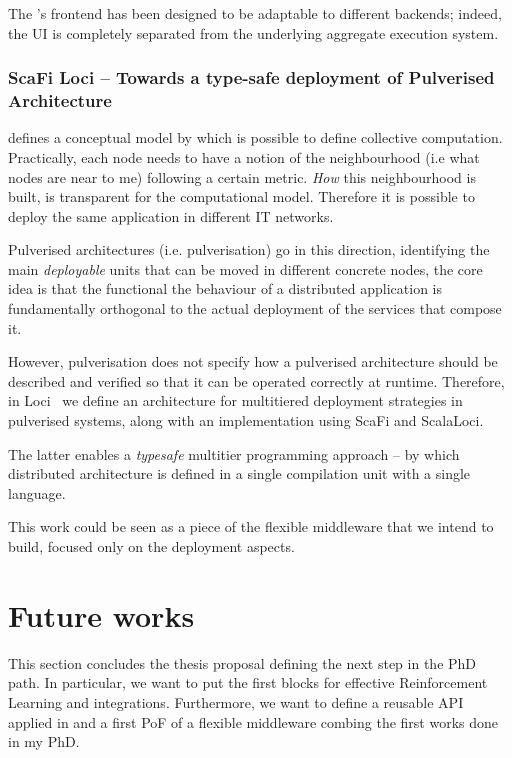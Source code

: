 \documentclass[11pt]{article}
\begin{document}
The \scafiweb{}'s frontend has been designed to be adaptable to different backends; indeed, the UI is completely separated from the underlying aggregate execution system. 

\subsubsection{ScaFi Loci -- Towards a type-safe deployment of Pulverised Architecture}
\ac{} defines a conceptual model by which is possible to define collective computation. Practically, each node needs to have a notion of the neighbourhood (i.e what nodes are near to me) following a certain metric. \textit{How} this neighbourhood is built, is transparent for the computational model. Therefore it is possible to deploy the same application in different IT networks.

Pulverised architectures (i.e. pulverisation) go in this direction, identifying the main \textit{deployable} units that can be moved in different concrete nodes, the core idea is that the functional
the behaviour of a distributed application is fundamentally orthogonal to the actual deployment of the services that compose it.

However, pulverisation does not specify how a pulverised architecture should
be described and verified so that it can be operated correctly
at runtime.
Therefore, in \scafi{} Loci~\cite{DBLP:conf/acsos/AguzziCPSV21} we define an architecture for multitiered deployment strategies in pulverised systems, along with an implementation using ScaFi and ScalaLoci.

The latter enables a \textit{typesafe} multitier programming approach -- by which distributed architecture is defined
in a single compilation unit with a single language.

This work could be seen as a piece of the flexible middleware that we intend to build, focused only on the deployment aspects.

\section{Future works}\label{future}
This section concludes the thesis proposal defining the next step in the PhD path. In particular, we want to put the first blocks for effective Reinforcement Learning and \acfull{} integrations. Furthermore, we want to define a reusable API applied in \cpsw{} and a first PoF of a flexible middleware combing the first works done in my PhD. 
\end{document}
